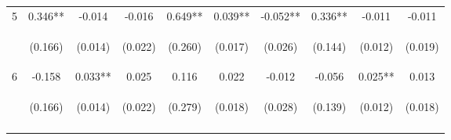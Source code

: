 \begin{tabular}{lccccccccc}
\noalign{\smallskip}5 & 0.346** & -0.014 & -0.016 & 0.649** & 0.039** & -0.052** & 0.336** & -0.011 & -0.011\\
 & \begin{footnotesize}(0.166)\end{footnotesize} & \begin{footnotesize}(0.014)\end{footnotesize} & \begin{footnotesize}(0.022)\end{footnotesize} & \begin{footnotesize}(0.260)\end{footnotesize} & \begin{footnotesize}(0.017)\end{footnotesize} & \begin{footnotesize}(0.026)\end{footnotesize} & \begin{footnotesize}(0.144)\end{footnotesize} & \begin{footnotesize}(0.012)\end{footnotesize} & \begin{footnotesize}(0.019)\end{footnotesize}\\
\noalign{\smallskip}6 & -0.158 & 0.033** & 0.025 & 0.116 & 0.022 & -0.012 & -0.056 & 0.025** & 0.013\\
 & \begin{footnotesize}(0.166)\end{footnotesize} & \begin{footnotesize}(0.014)\end{footnotesize} & \begin{footnotesize}(0.022)\end{footnotesize} & \begin{footnotesize}(0.279)\end{footnotesize} & \begin{footnotesize}(0.018)\end{footnotesize} & \begin{footnotesize}(0.028)\end{footnotesize} & \begin{footnotesize}(0.139)\end{footnotesize} & \begin{footnotesize}(0.012)\end{footnotesize} & \begin{footnotesize}(0.018)\end{footnotesize}\\
\noalign{\smallskip}\hline\end{tabular}\\

